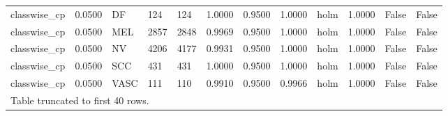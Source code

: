 \begin{table}[htbp]
\begin{tabular}{llllllllllll}
classwise\_cp & 0.0500 & DF & 124 & 124 & 1.0000 & 0.9500 & 1.0000 & holm & 1.0000 & False & False \\
classwise\_cp & 0.0500 & MEL & 2857 & 2848 & 0.9969 & 0.9500 & 1.0000 & holm & 1.0000 & False & False \\
classwise\_cp & 0.0500 & NV & 4206 & 4177 & 0.9931 & 0.9500 & 1.0000 & holm & 1.0000 & False & False \\
classwise\_cp & 0.0500 & SCC & 431 & 431 & 1.0000 & 0.9500 & 1.0000 & holm & 1.0000 & False & False \\
classwise\_cp & 0.0500 & VASC & 111 & 110 & 0.9910 & 0.9500 & 0.9966 & holm & 1.0000 & False & False \\
\multicolumn{12}{l}{Table truncated to first 40 rows.} \\
\hline
\end{tabular}
\end{table}
